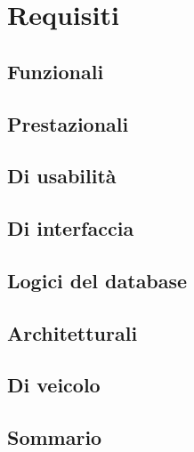 \section{Requisiti}

\subsection{Funzionali}
\subsection{Prestazionali}
\subsection{Di usabilità}
\subsection{Di interfaccia}
\subsection{Logici del database}
\subsection{Architetturali}
\subsection{Di veicolo}
\subsection{Sommario}
